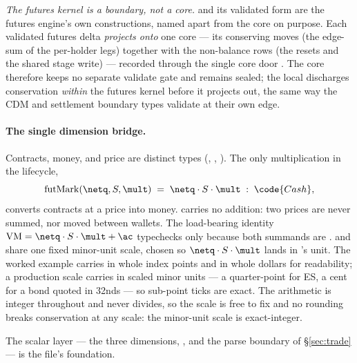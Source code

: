 \documentclass[11pt,a4paper]{article}
\begin{document}
\noindent\emph{The futures kernel is a boundary, not a core.}  and its validated
form  are the futures engine's own constructions, named apart from the core
 on purpose. Each validated futures delta \emph{projects onto} one core
 --- its conserving moves (the edge-sum of the per-holder legs) together with the
non-balance rows (the \ac{} resets and the shared stage write) --- recorded through the single core
door . The core therefore keeps no separate validate gate and remains sealed; the
local  discharges conservation \emph{within} the futures kernel before it projects
out, the same way the CDM and settlement boundary types validate at their own edge.

\paragraph{The single dimension bridge.} Contracts, money, and price are distinct types
(, , ). The only multiplication in the lifecycle,
\[
\mathrm{futMark}(\netq, S, \mult) \;=\; \netq \cdot S \cdot \mult \;:\; \code{Cash},
\]
converts contracts at a price into money.  carries no addition: two prices are never
summed, nor moved between wallets. The load-bearing identity $\mathrm{VM}=\netq\cdot S\cdot\mult+\ac$
typechecks only because both summands are .  and  share one fixed
minor-unit scale, chosen so $\netq\cdot S\cdot\mult$ lands in 's unit. The worked example
carries  in whole index points and  in whole dollars for readability; a
production scale carries  in scaled minor units --- a quarter-point for ES, a cent for a
bond quoted in 32nds --- so sub-point ticks are exact. The arithmetic is integer throughout and never
divides, so the scale is free to fix and no rounding breaks conservation at any scale: the minor-unit
scale is exact-integer.

The scalar layer --- the three dimensions, , and the  parse boundary of
\S\ref{sec:trade} --- is the file's foundation.
\end{document}
